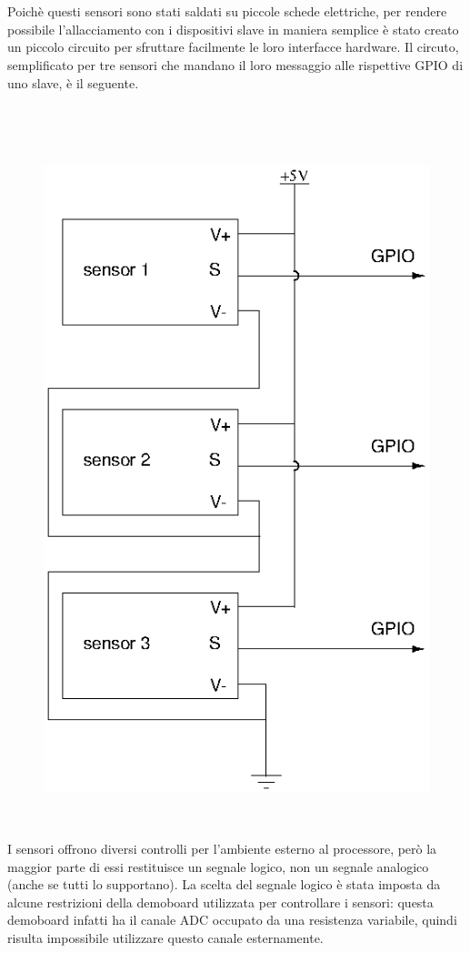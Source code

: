 \documentclass[a4paper,titlepage]{book}
\begin{document}
~

~

Poichè questi sensori sono stati saldati su piccole schede elettriche, per rendere possibile l'allacciamento con i dispositivi slave in maniera semplice è stato creato un piccolo circuito per sfruttare facilmente le loro interfacce hardware.
Il circuto, semplificato per tre sensori che mandano il loro messaggio alle rispettive GPIO di uno slave, è il seguente.

~

~

\begin{figure}[!h]
\centering
\includegraphics[scale=0.5]{circuitSensor.png}
\end{figure}


~

I sensori offrono diversi controlli per l'ambiente esterno al processore, però la maggior parte di essi restituisce un segnale logico, non un segnale analogico (anche se tutti lo supportano). La scelta del segnale logico è stata imposta da alcune restrizioni della demoboard utilizzata per controllare i sensori: questa demoboard infatti ha il canale ADC occupato da una resistenza variabile, quindi risulta impossibile utilizzare questo canale esternamente.
\end{document}
